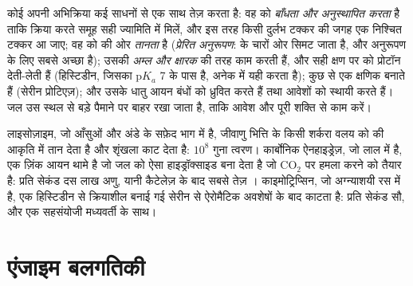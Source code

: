 \begin{proposition}[सक्रिय स्थल कैसे काम करता है]\label{prop:b1:enzymes:mechanisms}
कोई  अपनी अभिक्रिया कई साधनों से एक साथ तेज़ करता है: वह
 को \emph{बाँधता और अनुस्थापित करता} है ताकि क्रिया करते समूह
सही ज्यामिति में मिलें, और इस तरह किसी दुर्लभ टक्कर की जगह एक निश्चित
टक्कर आ जाए; वह  को  की ओर \emph{तानता} है
(\emph{प्रेरित अनुरूपण}:   के
चारों ओर सिमट जाता है, और अनुरूपण  के लिए सबसे अच्छा है);
उसकी  \emph{अम्ल और क्षारक} की तरह काम करती हैं, और सही
क्षण पर  को प्रोटॉन देती-लेती हैं (हिस्टिडीन, जिसका p$K_a$ 7 के
पास है, अनेक  में यही करता है); कुछ  से एक क्षणिक
\emph{} बनाते हैं (सेरीन प्रोटिएज़); और उसके धातु आयन बंधों
को ध्रुवित करते हैं तथा आवेशों को स्थायी करते हैं। जल उस स्थल से बड़े
पैमाने पर बाहर रखा जाता है, ताकि आवेश और  पूरी शक्ति से काम
करें।
\end{proposition}

\begin{example}[तीन एंजाइम]\label{ex:b1:enzymes:three}
लाइसोज़ाइम, जो आँसुओं और अंडे के सफ़ेद भाग में है, जीवाणु भित्ति के किसी
शर्करा वलय को  की आकृति में तान देता है और शृंखला काट देता
है: $10^8$ गुना त्वरण। कार्बोनिक ऐनहाइड्रेज़, जो लाल  में है, एक
ज़िंक आयन थामे है जो जल को ऐसा हाइड्रॉक्साइड बना देता है जो
$\mathrm{CO_2}$ पर हमला करने को तैयार है: प्रति सेकंड दस लाख अणु, यानी
कैटेलेज़ के बाद सबसे तेज़ । काइमोट्रिप्सिन, जो अग्न्याशयी रस में
है, एक हिस्टिडीन से क्रियाशील बनाई गई सेरीन से ऐरोमैटिक अवशेषों के बाद
 काटता है: प्रति सेकंड सौ, और एक सहसंयोजी मध्यवर्ती के साथ।
\end{example}

\section{एंजाइम बलगतिकी}

